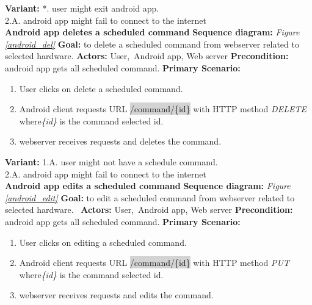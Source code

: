 \documentclass[12pt, oneside, a4paper]{book}
\newcommand{\code}[1]{{\color{red}\colorbox{lightgray}{#1}}}
\newcommand\boldcolor[1]{\textcolor{bold}{\textbf{#1}}}
\begin{document}
				\textbf{Variant:}\newline
				\hspace*{5mm}*. user might exit android app. \\
				\hspace*{5mm}2.A. android app might fail to connect to the internet \\
				\newline\boldcolor{Android app deletes a scheduled command}
				\newline\textbf{Sequence diagram:} \textit{Figure \ref{android_del}}
				\newline\textbf{Goal:} to delete a scheduled command from webserver related to selected hardware.
				\newline\textbf{Actors:} User, Android app, Web server
				\newline\textbf{Precondition:} android app gets all scheduled command.
				\newline\textbf{Primary Scenario:}	
				\begin{enumerate}[label*=\arabic*.]
					\item User clicks on delete a scheduled command.
					\item Android client requests URL \code{/command/\{id\}} with HTTP method \textit{DELETE} where\textit{\{id\}} is the command selected id. 
					\item  webserver receives requests and deletes the command.
				\end{enumerate}
				\textbf{Variant:}\newline
				\hspace*{5mm}1.A. user might not have a schedule command. \\
				\hspace*{5mm}2.A. android app might fail to connect to the internet \\
				\newline\boldcolor{Android app edits a scheduled command}
				\newline\textbf{Sequence diagram:} \textit{Figure \ref{android_edit}}
				\newline\textbf{Goal:} to edit a scheduled command from webserver related to selected hardware. 
				\newline\textbf{Actors:} User, Android app, Web server
				\newline\textbf{Precondition:} android app gets all scheduled command.
				\newline\textbf{Primary Scenario:}	
				\begin{enumerate}[label*=\arabic*.]
					\item User clicks on editing a scheduled command.
					\item Android client requests URL \code{/command/\{id\}} with HTTP method \textit{PUT} where\textit{\{id\}} is the command selected id. 
					\item  webserver receives requests and edits the command.
				\end{enumerate}
\end{document}
